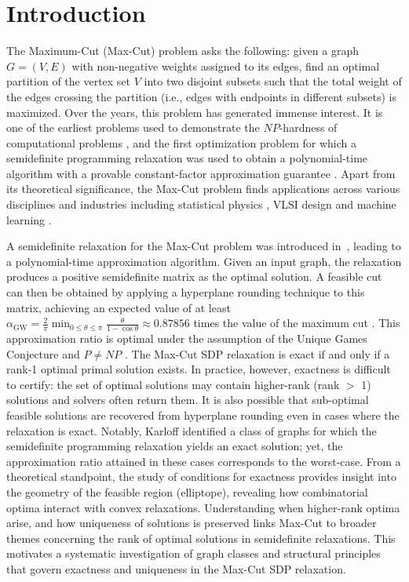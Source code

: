 \documentclass[a4paper,fleqn]{cas-sc}
\newcommand{\1}{\mathbf{1}}
\begin{document}
\section{Introduction}\label{intro}
The Maximum-Cut (Max-Cut) problem asks the following: given a graph $G = (V, E)$ with non-negative weights assigned to its edges, find an optimal partition of the vertex set $V$ into two disjoint subsets such that the total weight of the edges crossing the partition (i.e., edges with endpoints in different subsets) is maximized. Over the years, this problem has generated immense interest. It is one of the earliest problems used to demonstrate the $NP$-hardness of computational problems \citep{karp2009reducibility}, and the first optimization problem for which a semidefinite programming relaxation was used to obtain a polynomial-time algorithm with a provable constant-factor approximation guarantee \citep{goemans1995improved}.
Apart from its theoretical significance, the Max-Cut problem finds applications across various disciplines and industries including statistical physics \citep{barahona1988application}, VLSI design \citep{barahona1988application, franuke2011via} and machine learning \citep{wang2013semi}. 

A semidefinite relaxation for the Max-Cut problem was introduced in~\citet{goemans1995improved, poljak1995nonpolyhedral}, leading to a polynomial-time approximation algorithm. Given an input graph, the relaxation produces a positive semidefinite matrix as the optimal solution. A feasible cut can then be obtained by applying a hyperplane rounding technique to this matrix, achieving an expected value of at least $\alpha_{\text{GW}} =\frac{2}{\pi} \displaystyle\min_{0 \leq \theta \leq \pi} \frac{\theta}{1 - \cos \theta} \approx  0.87856$ times the value of the maximum cut \citep{goemans1995improved}. This approximation ratio is optimal under the assumption of the Unique Games Conjecture and $P \neq NP$ \citep{khot2007optimal}. The Max-Cut SDP relaxation is exact if and only if a rank-1 optimal primal solution exists. In practice, however, exactness is difficult to certify: the set of optimal solutions may contain higher-rank (rank $>$ 1) solutions and solvers often return them. It is also possible that sub-optimal feasible solutions are recovered from hyperplane rounding even in cases where the relaxation is exact. Notably, Karloff \citep{karloff1996good} identified a class of graphs for which the semidefinite programming relaxation yields an exact solution; yet, the approximation ratio attained in these cases corresponds to the worst-case. From a theoretical standpoint, the study of conditions for exactness provides insight into the geometry of the feasible region (elliptope), revealing how combinatorial optima interact with convex relaxations. Understanding when higher-rank optima arise, and how uniqueness of solutions is preserved links Max-Cut to broader themes concerning the rank of optimal solutions in semidefinite relaxations. This motivates a systematic investigation of graph classes and structural principles that govern exactness and uniqueness in the Max-Cut SDP relaxation.
\end{document}
